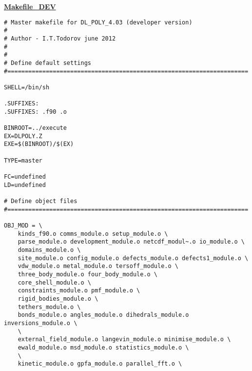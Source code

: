 \label{makefiles}
{\sc \bf \underline{Makefile\_DEV}}
\begin{verbatim}
# Master makefile for DL_POLY_4.03 (developer version)
#
# Author - I.T.Todorov june 2012
#
#
# Define default settings
#=====================================================================

SHELL=/bin/sh

.SUFFIXES:
.SUFFIXES: .f90 .o

BINROOT=../execute
EX=DLPOLY.Z
EXE=$(BINROOT)/$(EX)

TYPE=master

FC=undefined
LD=undefined

# Define object files
#=====================================================================

OBJ_MOD = \
	kinds_f90.o comms_module.o setup_module.o \
	parse_module.o development_module.o netcdf_modul~.o io_module.o \
	domains_module.o \
	site_module.o config_module.o defects_module.o defects1_module.o \
	vdw_module.o metal_module.o tersoff_module.o \
	three_body_module.o four_body_module.o \
	core_shell_module.o \
	constraints_module.o pmf_module.o \
	rigid_bodies_module.o \
	tethers_module.o \
	bonds_module.o angles_module.o dihedrals_module.o inversions_module.o \
	\
	external_field_module.o langevin_module.o minimise_module.o \
	ewald_module.o msd_module.o statistics_module.o \
	\
	kinetic_module.o gpfa_module.o parallel_fft.o \


\end{verbatim}

